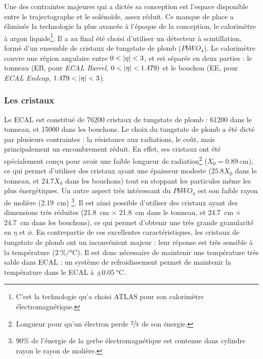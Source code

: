 Une des contraintes majeures qui a dictée sa conception est l'espace disponible entre le trajectographe et le solénoïde, assez réduit. Ce manque de place a éliminée la technologie la plus avancée à l'époque de la conception, le calorimètre à argon liquide\footnote{C'est la technologie qu'a choisi ATLAS pour son calorimètre électromagnétique.}. Il a au final été choisi d'utiliser un détecteur à scintillation, formé d'un ensemble de cristaux de tungstate de plomb ($PbWO_4$). Le calorimètre couvre une région angulaire entre $0 < \lvert \eta \rvert < 3$, et est séparée en deux parties : le tonneau (EB, pour \emph{ECAL Barrel}, $0 < \lvert \eta \rvert < \num{1.479})$ et le bouchon (EE, pour \emph{ECAL Endcap}, $\num{1.479} < \lvert \eta \rvert < 3$).

\subsubsection{Les cristaux}

Le ECAL est constitué de 76200 cristaux de tungstate de plomb : 61200 dans le tonneau, et 15000 dans les bouchons. Le choix du tungstate de plomb a été dicté par plusieurs contraintes : la résistance aux radiations, le coût, mais principalement un encombrement réduit. En effet, ses cristaux ont été spécialement conçu pour avoir une faible longueur de radiation\footnote{Longueur pour qu'un électron perde $\sfrac{2}{3}$ de son énergie.} ($X_0 = \SI{0.89}{\cm}$), ce qui permet d'utiliser des cristaux ayant une épaisseur modeste ($\num{25.8}X_0$ dans le tonneau, et $\num{24.7}X_0$ dans les bouchons) tout en stoppant les particules même les plus énergétiques. Un autre aspect très intéressant du $PbWO_4$ est son faible rayon de molière (\SI{2.19}{\cm}) \footnote{90\% de l'énergie de la gerbe électromagnétique est contenue dans cylindre rayon le rayon de molière.}. Il est ainsi possible d'utiliser des cristaux ayant des dimensions très réduites (\SI{21.8}{\cm} $\times$ \SI{21.8}{\cm} dans le tonneau, et \SI{24.7}{\cm} $\times$ \SI{24.7}{\cm} dans les bouchons), ce qui permet d'obtenir une très grande granularité en $\eta$ et $\phi$.
En contrepartie de ces excellentes caractéristiques, les cristaux de tungstate de plomb ont un inconvénient majeur : leur réponse est très sensible à la température (\tilde $\SI[per-mode = symbol]{2}{\percent\per\degreeCelsius}$). Il est donc nécessaire de maintenir une température très sable dans ECAL : un système de refroidissement permet de maintenir la température dans le ECAL à $\pm \SI{0.05}{\degreeCelsius}$.


